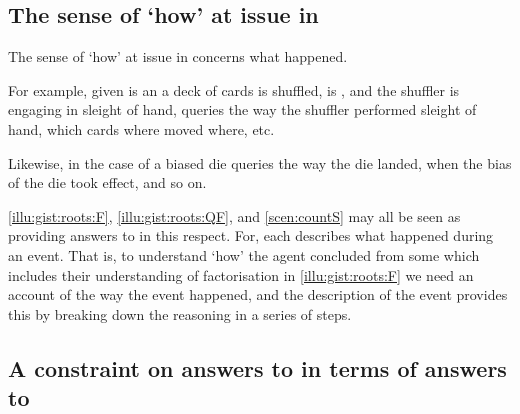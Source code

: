 \subsection{The sense of `how' at issue in \qHow{}}


\begin{note}
  The sense of `how' at issue in \qHow{} concerns what happened.

  For example, given is an  a deck of cards is shuffled, \mainCard{} is \mainCardPos{}, and the shuffler is engaging in sleight of hand, \qHow{} queries the way the shuffler performed sleight of hand, which cards where moved where, etc.

  Likewise, in the case of a biased die \qHow{} queries the way the die landed, when the bias of the die took effect, and so on.

   \ref{illu:gist:roots:F}, \ref{illu:gist:roots:QF}, and \ref{scen:countS} may all be seen as providing answers to \qHow{} in this respect.
  For, each \scen{} describes what happened during an event.
  That is, to understand `how' the agent concluded  from some \pool{} which includes their understanding of factorisation in \autoref{illu:gist:roots:F} we need an account of the way the event happened, and the description of the event provides this by breaking down the \agents{} reasoning in a series of steps.
\end{note}



\subsection{A constraint on answers to \qWhy{} in terms of answers to \qHow{}}


